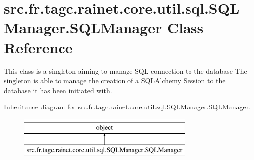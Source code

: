 \hypertarget{classsrc_1_1fr_1_1tagc_1_1rainet_1_1core_1_1util_1_1sql_1_1SQLManager_1_1SQLManager}{}\section{src.\+fr.\+tagc.\+rainet.\+core.\+util.\+sql.\+S\+Q\+L\+Manager.\+S\+Q\+L\+Manager Class Reference}
\label{classsrc_1_1fr_1_1tagc_1_1rainet_1_1core_1_1util_1_1sql_1_1SQLManager_1_1SQLManager}


This class is a singleton aiming to manage S\+Q\+L connection to the database The singleton is able to manage the creation of a S\+Q\+L\+Alchemy Session to the database it has been initiated with.  


Inheritance diagram for src.\+fr.\+tagc.\+rainet.\+core.\+util.\+sql.\+S\+Q\+L\+Manager.\+S\+Q\+L\+Manager\+:\begin{figure}[H]
\begin{center}
\leavevmode
\includegraphics[height=2.000000cm]{classsrc_1_1fr_1_1tagc_1_1rainet_1_1core_1_1util_1_1sql_1_1SQLManager_1_1SQLManager}
\end{center}
\end{figure}
